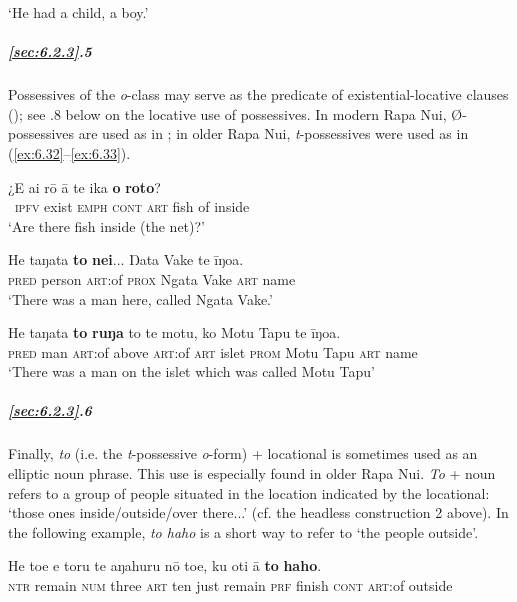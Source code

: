 \glt 
‘He had a child, a boy.’ \textstyleExampleref{[Ley-9-57.002]}
\z

\subparagraph{\ref{sec:6.2.3}.5} Possessives of the \textit{o}{}-class may serve as the predicate of existential-locative clauses (); see .8 below on the locative use of possessives. In modern Rapa Nui, Ø-possessives are used as in ; in older Rapa Nui, \textit{t}{}-possessives were used as in (\ref{ex:6.32}–\ref{ex:6.33}). 

\ea\label{ex:6.31}
\gll ¿E ai rō {\ꞌ}ā te ika \textbf{o} \textbf{roto}? \\
~\textsc{ipfv} exist \textsc{emph} \textsc{cont} \textsc{art} fish of inside \\

\glt 
‘Are there fish inside (the net)?’ \textstyleExampleref{[R241.058]} 
\z

\ea\label{ex:6.32}
\gll He taŋata \textbf{to} \textbf{nei}... Ŋata Vake te {\ꞌ}īŋoa.\\
\textsc{pred} person \textsc{art}:of \textsc{prox} Ngata Vake \textsc{art} name\\

\glt 
‘There was a man here, called Ngata Vake.’ \textstyleExampleref{[Ley-3-02.002]}
\z

\ea\label{ex:6.33}
\gll He taŋata \textbf{to} \textbf{ruŋa} to te motu, ko Motu Tapu te {\ꞌ}īŋoa. \\
\textsc{pred} man \textsc{art}:of above \textsc{art}:of \textsc{art} islet \textsc{prom} Motu Tapu \textsc{art} name \\

\glt 
‘There was a man on the islet which was called Motu Tapu’ \textstyleExampleref{[Ley-8-52.024]}
\z

\subparagraph{\ref{sec:6.2.3}.6} Finally, \textit{to} (i.e. the \textit{t}{}-possessive \textit{o}{}-form) + locational is sometimes used as an elliptic noun phrase. This use is especially found in older Rapa Nui. \textit{To} + noun refers to a group of people situated in the location indicated by the locational: ‘those ones inside/outside/over there...’ (cf. the headless construction 2 above). In the following example, \textit{to haho} is a short way to refer to ‘the people outside’.

\ea\label{ex:6.34}
\gll He toe e toru te {\ꞌ}aŋahuru nō toe, ku oti {\ꞌ}ā \textbf{to} \textbf{haho}.  \\
\textsc{ntr} remain \textsc{num} three \textsc{art} ten just remain \textsc{prf} finish \textsc{cont} \textsc{art}:of outside  \\

